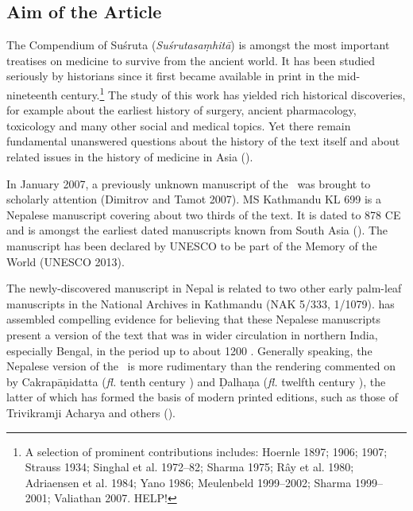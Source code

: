 
\subsection{Aim of the Article}

The Compendium of Suśruta (\emph{Suśrutasaṃhitā}) is amongst the most important treatises on medicine to survive from the ancient world. It has been studied seriously by historians since it first became available in print in the mid-nineteenth century.\footnote{A selection of prominent contributions includes: Hoernle 1897; 1906; 1907; Strauss 1934; Singhal et al. 1972–82; Sharma 1975; Rây et al. 1980; Adriaensen et al. 1984; Yano 1986; Meulenbeld 1999–2002; Sharma 1999–2001; Valiathan 2007. HELP!} The study of this work has yielded rich historical discoveries, for example about the earliest history of surgery, ancient pharmacology, toxicology and many other social and medical topics. Yet there remain fundamental unanswered questions about the history of the text itself and about related issues in the history of medicine in Asia (\cite[IA, 203–389]{meul-hist}). 

In January 2007, a previously unknown manuscript of the \SS\ was brought to scholarly attention (Dimitrov and Tamot 2007). MS Kathmandu KL 699 is a Nepalese manuscript covering about two thirds of the text. It is dated to 878 CE and is amongst the earliest dated manuscripts known from South Asia (\cite[87–88]{hari-2011}). The manuscript has been declared by UNESCO to be part of the Memory of the World (UNESCO 2013).

The newly-discovered manuscript in Nepal is related to two other early palm-leaf manuscripts in the National Archives in Kathmandu (NAK 5/333, 1/1079). \citet{kleb-2021b} has assembled compelling evidence for believing that these Nepalese manuscripts present a version of the text that was in wider circulation in northern India, especially Bengal, in the period up to about 1200 \AD. Generally speaking, the Nepalese version of the \SS\ is more rudimentary than the rendering commented on by Cakrapāṇidatta (\emph{fl.} tenth century \AD) and Ḍalhaṇa (\emph{fl.} twelfth century \AD), the latter of which has formed the basis of modern printed editions, such as those of Trivikramji Acharya and others (\cite{susr-trikamji1,vulgate,shar-susr}). 

